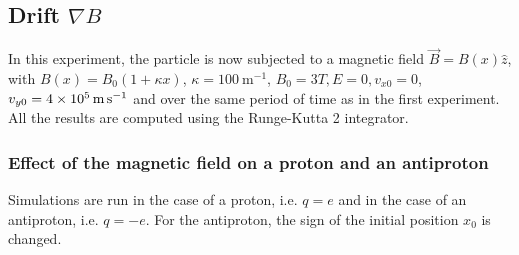 \documentclass[a4paper,12pt,twoside]{article}
\begin{document}
\subsection{Drift $\nabla B$}
In this experiment, the particle is now subjected to a magnetic field $\vec{B}=B(x)\hat{z}$, with $B(x)=B_0(1+\kappa x)$, $\kappa=\SI{100}{\metre^{-1}}$, $B_0=3T, E=0, v_{x0}=0$, $v_{y0}=\SI{4d5}{\metre\per\second}$ and over the same period of time as in the first experiment.
All the results are computed using the Runge-Kutta 2 integrator.

\subsubsection{Effect of the magnetic field on a proton and an antiproton}

Simulations are run in the case of a proton, i.e. $q=e$ and in the case of an antiproton, i.e. $q=-e$. For the antiproton, the sign of the initial position $x_0$ is changed.
\end{document}
